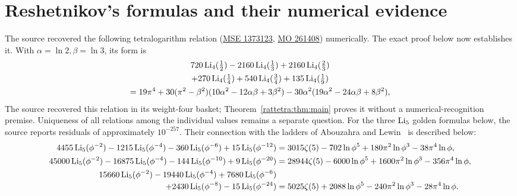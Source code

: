 \section{Reshetnikov's formulas and their numerical evidence}
The source recovered the following tetralogarithm relation
(\href{https://math.stackexchange.com/q/1373123}{MSE 1373123},
\href{https://mathoverflow.net/q/261408}{MO 261408}) numerically.
The exact proof below now establishes it. With $\alpha=\ln2,\beta=\ln3$, its form is
\begin{multline}\label{golden:eq:tetra}
  720\operatorname{Li}_4(\tfrac12)-2160\operatorname{Li}_4(\tfrac13)+2160\operatorname{Li}_4(\tfrac23)\\+270\operatorname{Li}_4(\tfrac14)+540\operatorname{Li}_4(\tfrac34)+135\operatorname{Li}_4(\tfrac19)\\
  =19\pi^4+30(\pi^2-\beta^2)(10\alpha^2-12\alpha\beta+3\beta^2)-30\alpha^2(19\alpha^2-24\alpha\beta+8\beta^2),
\end{multline}
The source recovered this relation in its weight-four basket; Theorem~\ref{rattetra:thm:main} proves it without a numerical-recognition premise. Uniqueness of all relations among the individual values remains a separate question.
For the three $\operatorname{Li}_5$ golden formulas below, the source reports residuals
of approximately $10^{-257}$. Their connection with the ladders of
Abouzahra and Lewin~\cite{golden:AbouzahraLewin1985} is described below:
{\scriptsize
\begin{align}
  4455\operatorname{Li}_5(\phi^{-2})-1215\operatorname{Li}_5(\phi^{-4})-360\operatorname{Li}_5(\phi^{-6})+15\operatorname{Li}_5(\phi^{-12})
  &=3015\zeta(5)-702\ln\phi^5+180\pi^2\ln\phi^3-38\pi^4\ln\phi,\notag\\
  45000\operatorname{Li}_5(\phi^{-2})-16875\operatorname{Li}_5(\phi^{-4})-144\operatorname{Li}_5(\phi^{-10})+9\operatorname{Li}_5(\phi^{-20})
  &=28944\zeta(5)-6000\ln\phi^5+1600\pi^2\ln\phi^3-356\pi^4\ln\phi,\notag\\
  15660\operatorname{Li}_5(\phi^{-2})-19440\operatorname{Li}_5(\phi^{-4})+7680\operatorname{Li}_5(\phi^{-6})
  &\notag\\[-2pt]
  \quad+2430\operatorname{Li}_5(\phi^{-8})-15\operatorname{Li}_5(\phi^{-24})
  &=5025\zeta(5)+2088\ln\phi^5-240\pi^2\ln\phi^3-28\pi^4\ln\phi.\notag
\end{align}}

